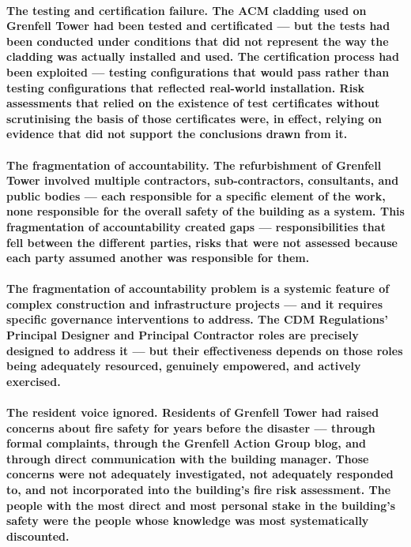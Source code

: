 \paragraph{\textbf{The testing and certification failure}. The ACM cladding used on Grenfell Tower had been tested and certificated — but the tests had been conducted under conditions that did not represent the way the cladding was actually installed and used. The certification process had been exploited — testing configurations that would pass rather than testing configurations that reflected real-world installation. Risk assessments that relied on the existence of test certificates without scrutinising the basis of those certificates were, in effect, relying on evidence that did not support the conclusions drawn from it.}
\paragraph{\textbf{The fragmentation of accountability}. The refurbishment of Grenfell Tower involved multiple contractors, sub-contractors, consultants, and public bodies — each responsible for a specific element of the work, none responsible for the overall safety of the building as a system. This fragmentation of accountability created gaps — responsibilities that fell between the different parties, risks that were not assessed because each party assumed another was responsible for them.}
\paragraph{The fragmentation of accountability problem is a systemic feature of complex construction and infrastructure projects — and it requires specific governance interventions to address. The CDM Regulations' Principal Designer and Principal Contractor roles are precisely designed to address it — but their effectiveness depends on those roles being adequately resourced, genuinely empowered, and actively exercised.}
\paragraph{\textbf{The resident voice ignored}. Residents of Grenfell Tower had raised concerns about fire safety for years before the disaster — through formal complaints, through the Grenfell Action Group blog, and through direct communication with the building manager. Those concerns were not adequately investigated, not adequately responded to, and not incorporated into the building's fire risk assessment. The people with the most direct and most personal stake in the building's safety were the people whose knowledge was most systematically discounted.}

